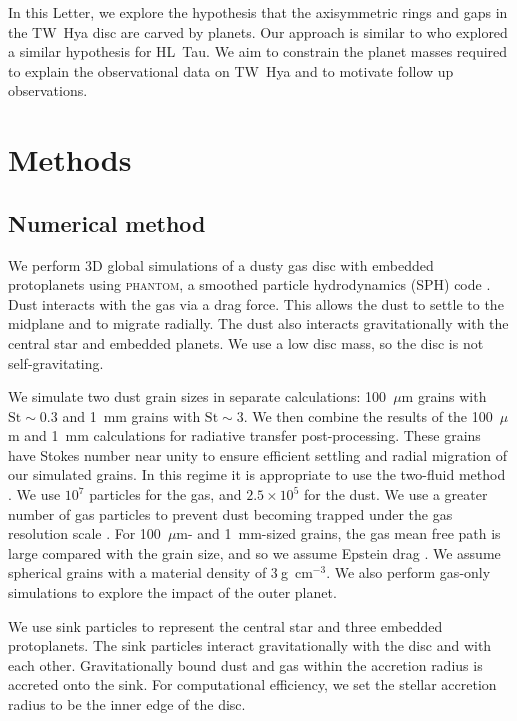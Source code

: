 \documentclass[usenatbib,a4paper,times]{mnras}
\newcommand{\st}{\mathrm{St}}
\renewcommand{\phantom}{\textsc{phantom}}
\begin{document}
In this Letter, we explore the hypothesis that the axisymmetric rings and gaps
in the TW~Hya disc are carved by planets. Our approach is similar to
\citet{dipierro:2015} who explored a similar hypothesis for HL~Tau. We aim to
constrain the planet masses required to explain the observational data on TW~Hya
and to motivate follow up observations.










\section{Methods}
\label{sec:methods}

\subsection{Numerical method}

We perform 3D global simulations of a dusty gas disc with embedded protoplanets
using \phantom{}, a smoothed particle hydrodynamics (SPH) code
\citep{price:2018a}. Dust interacts with the gas via a drag force. This allows
the dust to settle to the midplane and to migrate radially. The dust also
interacts gravitationally with the central star and embedded planets. We use a
low disc mass, so the disc is not self-gravitating.

We simulate two dust grain sizes in separate calculations: 100~$\mu$m grains
with $\st{}\sim 0.3$ and 1~mm grains with $\st{}\sim 3$. We then combine the
results of the 100~$\mu$m and 1~mm calculations for radiative transfer
post-processing. These grains have Stokes number near unity to ensure efficient
settling and radial migration of our simulated grains. In this regime it is
appropriate to use the two-fluid method \citep{laibe:2012a}. We use $10^7$
particles for the gas, and $2.5\times 10^5$ for the dust. We use a greater
number of gas particles to prevent dust becoming trapped under the gas
resolution scale \citep{laibe:2012a}. For 100~$\mu$m- and 1~mm-sized grains, the
gas mean free path is large compared with the grain size, and so we assume
Epstein drag \citet{epstein:1924}. We assume spherical grains with a material
density of $3\ $g~cm$^{-3}$. We also perform gas-only simulations to explore the
impact of the outer planet.

We use sink particles \citep{bate:1995} to represent the central star and three
embedded protoplanets. The sink particles interact gravitationally with the disc
and with each other. Gravitationally bound dust and gas within the accretion
radius is accreted onto the sink. For computational efficiency, we set the
stellar accretion radius to be the inner edge of the disc.
\end{document}
